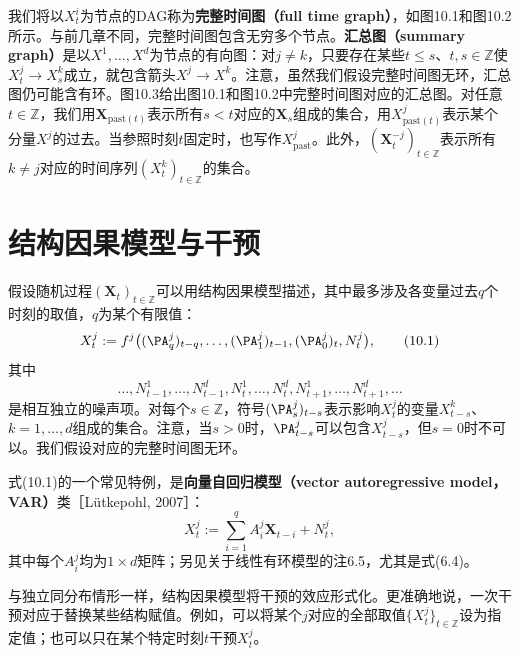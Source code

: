 


我们将以$X_t^i$为节点的DAG称为\textbf{完整时间图（full time graph）}，如图10.1和图10.2所示。与前几章不同，完整时间图包含无穷多个节点。\textbf{汇总图（summary graph）}是以$X^1,\ldots,X^d$为节点的有向图：对$j\ne k$，只要存在某些$t\le s$、$t,s\in\mathbb Z$使$X_t^j\to X_s^k$成立，就包含箭头$X^j\to X^k$。注意，虽然我们假设完整时间图无环，汇总图仍可能含有环。图10.3给出图10.1和图10.2中完整时间图对应的汇总图。对任意$t\in\mathbb Z$，我们用$\mathbf X_{\mathrm{past}(t)}$表示所有$s<t$对应的$\mathbf X_s$组成的集合，用$X_{\mathrm{past}(t)}^j$表示某个分量$X^j$的过去。当参照时刻$t$固定时，也写作$X_{\mathrm{past}}^j$。此外，$(\mathbf X_t^{-j})_{t\in\mathbb Z}$表示所有$k\ne j$对应的时间序列$(X_t^k)_{t\in\mathbb Z}$的集合。

\FloatBarrier

\section{结构因果模型与干预}
假设随机过程$(\mathbf X_t)_{t\in\mathbb Z}$可以用结构因果模型描述，其中最多涉及各变量过去$q$个时刻的取值，$q$为某个有限值：
\begin{equation}
 X_t^j:=f^j\bigl((\PA_q^j)_{t-q},\ldots,(\PA_1^j)_{t-1},(\PA_0^j)_t,N_t^j\bigr),
 \tag{10.1}
\end{equation}
其中
\[
 \ldots,N_{t-1}^1,\ldots,N_{t-1}^d,N_t^1,\ldots,N_t^d,N_{t+1}^1,\ldots,N_{t+1}^d,\ldots
\]
是相互独立的噪声项。对每个$s\in\mathbb Z$，符号$(\PA_s^j)_{t-s}$表示影响$X_t^j$的变量$X_{t-s}^k$、$k=1,\ldots,d$组成的集合。注意，当$s>0$时，$\PA_{t-s}^j$可以包含$X_{t-s}^j$，但$s=0$时不可以。我们假设对应的完整时间图无环。

式(10.1)的一个常见特例，是\textbf{向量自回归模型（vector autoregressive model，VAR）}类［Lütkepohl, 2007］：
\begin{equation}
 X_t^j:=\sum_{i=1}^q A_i^j\mathbf X_{t-i}+N_t^j,
 \tag{10.2}
\end{equation}
其中每个$A_i^j$均为$1\times d$矩阵；另见关于线性有环模型的注6.5，尤其是式(6.4)。

与独立同分布情形一样，结构因果模型将干预的效应形式化。更准确地说，一次干预对应于替换某些结构赋值。例如，可以将某个$j$对应的全部取值$\{X_t^j\}_{t\in\mathbb Z}$设为指定值；也可以只在某个特定时刻$t$干预$X_t^j$。

